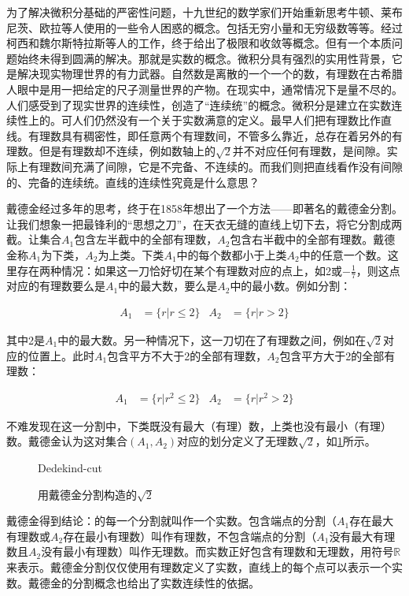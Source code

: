 \documentclass[b5paper]{ctexart}
\begin{document}
为了解决微积分基础的严密性问题，十九世纪的数学家们开始重新思考牛顿、莱布尼茨、欧拉等人使用的一些令人困惑的概念。包括无穷小量和无穷级数等等。经过柯西和魏尔斯特拉斯等人的工作，终于给出了极限和收敛等概念。但有一个本质问题始终未得到圆满的解决。那就是实数的概念。微积分具有强烈的实用性背景，它是解决现实物理世界的有力武器。自然数是离散的一个一个的数，有理数在古希腊人眼中是用一把给定的尺子测量世界的产物。在现实中，通常情况下是量不尽的。人们感受到了现实世界的连续性，创造了“连续统”的概念。微积分是建立在实数连续性上的。可人们仍然没有一个关于实数满意的定义。最早人们把有理数比作直线。有理数具有稠密性，即任意两个有理数间，不管多么靠近，总存在着另外的有理数。但是有理数却不连续，例如数轴上的$\sqrt{2}$并不对应任何有理数，是间隙。实际上有理数间充满了间隙，它是不完备、不连续的。而我们则把直线看作没有间隙的、完备的连续统。直线的连续性究竟是什么意思？

戴德金经过多年的思考，终于在1858年想出了一个方法——即著名的戴德金分割。让我们想象一把最锋利的“思想之刀”，在天衣无缝的直线上切下去，将它分割成两截。让集合$A_1$包含左半截中的全部有理数，$A_2$包含右半截中的全部有理数。戴德金称$A_1$为下类，$A_2$为上类。下类$A_1$中的每个数都小于上类$A_2$中的任意一个数。这里存在两种情况：如果这一刀恰好切在某个有理数对应的点上，如2或$-\frac{1}{7}$，则这点对应的有理数要么是$A_1$中的最大数，要么是$A_2$中的最小数。例如分割：

\begin{align*}
A_1 &= \{r | r \leq 2\}  & A_2 &= \{r | r > 2\}
\end{align*}

其中2是$A_1$中的最大数。另一种情况下，这一刀切在了有理数之间，例如在$\sqrt{2}$对应的位置上。此时$A_1$包含平方不大于2的全部有理数，$A_2$包含平方大于2的全部有理数：

\begin{align*}
A_1 &= \{r | r^2 \leq 2\}  & A_2 &= \{r | r^2 > 2\}
\end{align*}

不难发现在这一分割中，下类既没有最大（有理）数，上类也没有最小（有理）数。戴德金认为这对集合$(A_1, A_2)$对应的划分定义了无理数$\sqrt{2}$，如\cref{fig:Dedekind-cut}所示。

\begin{figure}[htbp]
 \centering
 {Dedekind-cut}
 \caption{用戴德金分割构造的$\sqrt{2}$}
 \label{fig:Dedekind-cut}
\end{figure}


\label{sec:Dedekind-cut}
戴德金得到结论：的每一个分割就叫作一个实数。包含端点的分割（$A_1$存在最大有理数或$A_2$存在最小有理数）叫作有理数，不包含端点的分割（$A_1$没有最大有理数且$A_2$没有最小有理数）叫作无理数。而实数正好包含有理数和无理数，用符号$\mathbb{R}$来表示。戴德金分割仅仅使用有理数定义了实数，直线上的每个点可以表示一个实数。戴德金的分割概念也给出了实数连续性的依据。
\end{document}
